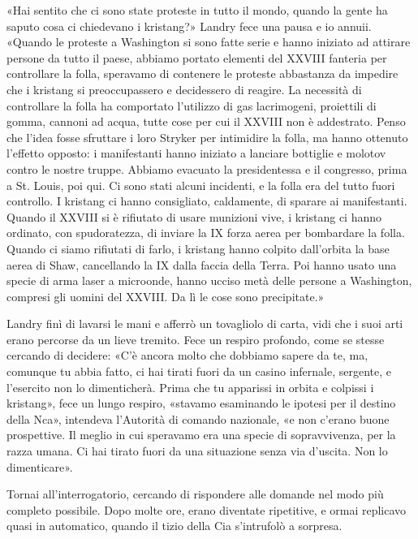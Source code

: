 «Hai sentito che ci sono state proteste in tutto il mondo, quando la
gente ha saputo cosa ci chiedevano i kristang?» Landry fece una pausa e
io annuii. «Quando le proteste a Washington si sono fatte serie e hanno
iniziato ad attirare persone da tutto il paese, abbiamo portato elementi
del XXVIII fanteria per controllare la folla, speravamo di contenere le
proteste abbastanza da impedire che i kristang si preoccupassero e
decidessero di reagire. La necessità di controllare la folla ha
comportato l'utilizzo di gas lacrimogeni, proiettili di gomma, cannoni
ad acqua, tutte cose per cui il XXVIII non è addestrato. Penso che
l'idea fosse sfruttare i loro Stryker per intimidire la folla, ma hanno
ottenuto l'effetto opposto: i manifestanti hanno iniziato a lanciare
bottiglie e molotov contro le nostre truppe. Abbiamo evacuato la
presidentessa e il congresso, prima a St. Louis, poi qui. Ci sono stati
alcuni incidenti, e la folla era del tutto fuori controllo. I kristang
ci hanno consigliato, caldamente, di sparare ai manifestanti. Quando il
XXVIII si è rifiutato di usare munizioni vive, i kristang ci hanno
ordinato, con spudoratezza, di inviare la IX forza aerea per bombardare
la folla. Quando ci siamo rifiutati di farlo, i kristang hanno colpito
dall'orbita la base aerea di Shaw, cancellando la IX dalla faccia della
Terra. Poi hanno usato una specie di arma laser a microonde, hanno
ucciso metà delle persone a Washington, compresi gli uomini del XXVIII.
Da lì le cose sono precipitate.»

Landry finì di lavarsi le mani e afferrò un tovagliolo di carta, vidi
che i suoi arti erano percorse da un lieve tremito. Fece un respiro
profondo, come se stesse cercando di decidere: «C'è ancora molto che
dobbiamo sapere da te, ma, comunque tu abbia fatto, ci hai tirati fuori
da un casino infernale, sergente, e l'esercito non lo dimenticherà.
Prima che tu apparissi in orbita e colpissi i kristang», fece un lungo
respiro, «stavamo esaminando le ipotesi per il destino della Nca»,
intendeva l'Autorità di comando nazionale, «e non c'erano buone
prospettive. Il meglio in cui speravamo era una specie di sopravvivenza,
per la razza umana. Ci hai tirato fuori da una situazione senza via
d'uscita. Non lo dimenticare».

\hfill\break

Tornai all'interrogatorio, cercando di rispondere alle domande nel modo
più completo possibile. Dopo molte ore, erano diventate ripetitive, e
ormai replicavo quasi in automatico, quando il tizio della Cia
s'intrufolò a sorpresa.

